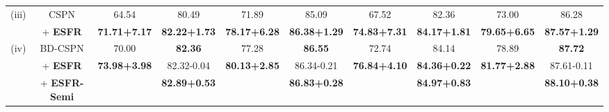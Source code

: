 \documentclass{article}
\begin{document}
\begin{table*}[t]
\begin{small}
\begin{center}
\begin{tabular}{cccccccccc}
				\multirow{2}{*}{(iii)} & CSPN & 64.54 & 80.49 & 71.89 & 85.09 & 67.52 & 82.36 & 73.00 & 86.28 \\
				&\cellcolor[HTML]{EFEFEF} + \textbf{ESFR} &\cellcolor[HTML]{EFEFEF} \textbf{71.71{\scriptsize+7.17}} &\cellcolor[HTML]{EFEFEF} \textbf{82.22{\scriptsize+1.73}} &\cellcolor[HTML]{EFEFEF} \textbf{78.17{\scriptsize+6.28}} &\cellcolor[HTML]{EFEFEF} \textbf{86.38{\scriptsize+1.29}} &\cellcolor[HTML]{EFEFEF} \textbf{74.83{\scriptsize+7.31}} &\cellcolor[HTML]{EFEFEF} \textbf{84.17{\scriptsize+1.81}} &\cellcolor[HTML]{EFEFEF} \textbf{79.65{\scriptsize+6.65}} &\cellcolor[HTML]{EFEFEF} \textbf{87.57{\scriptsize+1.29}} \\ \hline
				\multirow{3}{*}{(iv)} & BD-CSPN & 70.00 & \textbf{82.36} & 77.28 & \textbf{86.55} & 72.74 & 84.14 & 78.89 & \textbf{87.72} \\
				& \cellcolor[HTML]{EFEFEF} + \textbf{ESFR} & \cellcolor[HTML]{EFEFEF} \textbf{73.98{\scriptsize+3.98}} & \cellcolor[HTML]{EFEFEF} 82.32{\scriptsize-0.04} & \cellcolor[HTML]{EFEFEF} \textbf{80.13{\scriptsize+2.85}} & \cellcolor[HTML]{EFEFEF} 86.34{\scriptsize-0.21} & \cellcolor[HTML]{EFEFEF} \textbf{76.84{\scriptsize+4.10}} & \cellcolor[HTML]{EFEFEF} \textbf{84.36{\scriptsize+0.22}} & \cellcolor[HTML]{EFEFEF} \textbf{81.77{\scriptsize+2.88}} & \cellcolor[HTML]{EFEFEF} 87.61{\scriptsize-0.11} \\
				& \cellcolor[HTML]{EFEFEF} + \textbf{ESFR-Semi} & \cellcolor[HTML]{EFEFEF}  & \cellcolor[HTML]{EFEFEF} \textbf{82.89{\scriptsize+0.53}} & \cellcolor[HTML]{EFEFEF}  & \cellcolor[HTML]{EFEFEF} \textbf{86.83{\scriptsize+0.28}} & \cellcolor[HTML]{EFEFEF}  & \cellcolor[HTML]{EFEFEF} \textbf{84.97{\scriptsize+0.83}} & \cellcolor[HTML]{EFEFEF}  & \cellcolor[HTML]{EFEFEF} \textbf{88.10{\scriptsize+0.38}} \\ \hline
			\end{tabular}
		\end{center}
	\end{small}
\end{table*}
\end{document}
